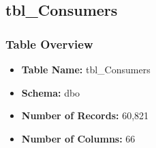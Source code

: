 \begin{landscape}
\subsection{tbl\_Consumers}

\subsubsection{Table Overview}
\begin{itemize}
\item \textbf{Table Name:} tbl\_Consumers
\item \textbf{Schema:} dbo
\item \textbf{Number of Records:} 60,821
\item \textbf{Number of Columns:} 66
\end{itemize}


\end{landscape}
